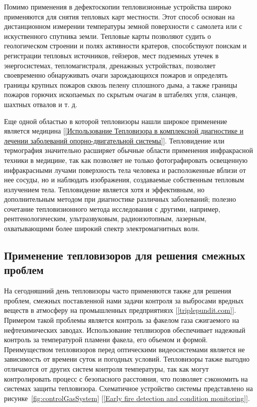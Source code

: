 \documentclass[14pt, a4paper]{extreport}
\begin{document}
	Помимо применения в дефектоскопии тепловизионные устройства широко применяются для снятия тепловых карт местности. Этот способ основан на дистанционном измерении температуры земной поверхности с самолета или с искуственного спутника земли. Тепловые карты позволяют судить о геологическом строении и полях активности кратеров, способствуют поискам и регистрации тепловых источников, гейзеров, мест подземных утечек в энергосистемах, тепломагистраля, дренажных устройствах, позволяет своевременно обнаруживать очаги зарождающихся пожаров и определять границы крупных пожаров сквозь пелену сплошного дыма, а также границы пожаров горючих ископаемых по скрытым очагам в штабелях угля, сланцев, шахтных отвалов и т. д.
	
	Еще одной областью в которой тепловизоры нашли широкое применение является медицина [\ref{Использование Тепловизора в комплексной
		диагностике и лечении заболеваний опорно-двигательной системы}]. Тепловидение или термография значительно расширяет обычные области применения инфракрасной техники в медицине, так как позволяет не только фотографировать освещенную инфракрасными лучами поверхность тела человека и расположенные вблизи от нее сосуды, но и наблюдать изображения, создаваемые собственным тепловым излучением тела. Тепловидение является хотя и эффективным, но дополнительным методом при диагностике различных заболеваний; полезно сочетание тепловизионного метода исследования с другими, например, рентгенологическим, ультразвуковым, радиоизотопным, лазерным, охватывающими более широкий спектр электромагнитных волн.
	
\subsection{Применение тепловизоров для решения смежных проблем}
	На сегодняшний день тепловизоры часто применяются также для решения проблем, смежных поставленной нами задачи контроля за выбросами вредных веществ в атмосферу на промышленных предприятиязх [\ref{triplepundit.com}]. Примером такой проблемы является контроль за факелом газа сжигаемого на нефтехимических заводах. Использование теплвизоров обеспечивает надежный контроль за температурой пламени факела, его объемом и формой. Преимуществом тепловизоров перед оптическими видеосистемами является не зависимость от времени суток и погодных условий. Тепловизоры также выгодно отличаются от других систем контроля температуры, так как могут контролировать процесс с безопасного расстояния, что позволяет сэкономить на системах защиты тепловизора. Схематичное устройство системы представлено на рисунке~\ref{fig:controlGasSystem} [\ref{Early fire detection and condition monitoring}].
	
\end{document}
